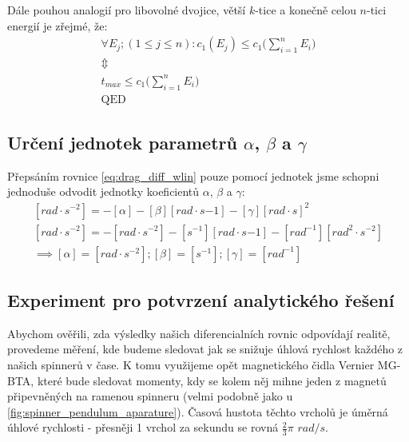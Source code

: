 Dále pouhou analogií pro libovolné dvojice, větší $k$-tice a konečně celou $n$-tici energií je zřejmé, že:
\begin{equation}
    \label{eq:max_runtime_proof_p5}
    \begin{gathered}
        \forall E_j; (1 \leq j \leq n): c_1(E_j) \leq c_1 \Bigg(\sum_{i=1}^n E_i \Bigg) \\
        \Updownarrow \\
        t_{max} \leq c_1 \Bigg(\sum_{i=1}^n E_i \Bigg) \\
        \text{QED}
    \end{gathered}
\end{equation}

\subsection{Určení jednotek parametrů $\alpha$, $\beta$ a $\gamma$}

Přepsáním rovnice \ref{eq:drag_diff_wlin} pouze pomocí jednotek jsme schopni jednoduše odvodit jednotky koeficientů $\alpha$, $\beta$ a $\gamma$:
\begin{equation}
    \label{eq:drag_units}
    \begin{gathered}
        [rad \cdot s^{-2}] = - [\alpha] - [\beta] [rad \cdot s{-1}] - [\gamma] [rad \cdot s]^2 \\
        [rad \cdot s^{-2}] = - [rad \cdot s^{-2}] - [s^{-1}] [rad \cdot s{-1}] - [rad^{-1}] [rad^2 \cdot s^{-2}] \\
        \implies [\alpha] = [rad \cdot s^{-2}]; [\beta] = [s^{-1}]; [\gamma] = [rad^{-1}]
    \end{gathered}
\end{equation}

\clearpage

\subsection{Experiment pro potvrzení analytického řešení}

Abychom ověřili, zda výsledky našich diferencialních rovnic odpovídají realitě, provedeme měření, kde budeme sledovat jak se snižuje úhlová rychlost každého z našich spinnerů v čase. K tomu využijeme opět magnetického čidla Vernier MG-BTA, které bude sledovat momenty, kdy se kolem něj mihne jeden z magnetů připevněných na ramenou spinneru (velmi podobně jako u \autoref{fig:spinner_pendulum_aparature}). Časová hustota těchto vrcholů je úměrná úhlové rychlosti - přesněji 1 vrchol za sekundu se rovná $\frac{2}{3}\pi$ $rad/s$.

